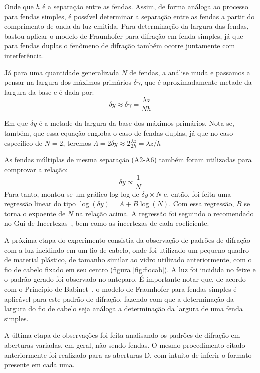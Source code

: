 Onde que $h$ é a separação entre as fendas. Assim, de forma análoga ao processo para fendas simples, é possível determinar a separação entre as fendas a partir do comprimento de onda da luz emitida. Para determinação da largura das fendas, bastou aplicar o modelo de Fraunhofer para difração em fenda simples, já que para fendas duplas o fenômeno de difração também ocorre juntamente com interferência.

Já para uma quantidade generalizada $N$ de fendas, a análise muda e passamos a pensar na largura dos máximos primários $\delta\gamma$, que é aproximadamente metade da largura da base e é dada por:
\begin{equation}
    \delta y \approx \delta\gamma = \frac{\lambda z}{N h} \label{eq:mult}
\end{equation}

Em que $\delta y$ é a metade da largura da base dos máximos primários. Nota-se, também, que essa equação engloba o caso de fendas duplas, já que no caso específico de $N = 2$, teremos $\Lambda = 2 \delta y \approx 2 \frac{\lambda z}{2 h} = \lambda z / h$

As fendas múltiplas de mesma separação (A2-A6) também foram utilizadas para comprovar a relação: $$\delta y \propto \frac{1}{N} \label{rel:dyn}$$ Para tanto, montou-se um gráfico log-log de $\delta y \times N$ e, então, foi feita uma regressão linear do tipo $\log(\delta y) = A + B \log(N)$. Com essa regressão, $B$ se torna o expoente de $N$ na relação acima. A regressão foi seguindo o recomendado no Gui de Incertezas~\cite{ref:gum}, bem como as incertezas de cada coeficiente.

A próxima etapa do experimento consistia da observação de padrões de difração com a luz incidindo em um fio de cabelo, onde foi utilizado um pequeno quadro de material plástico, de tamanho similar ao vidro utilizado anteriormente, com o fio de cabelo fixado em seu centro (figura \ref{fig:fiocab}). A luz foi incidida no feixe e o padrão gerado foi observado no anteparo. É importante notar que, de acordo com o Princípio de Babinet~\cite{ref:wolf}, o modelo de Fraunhofer para fendas simples é aplicável para este padrão de difração, fazendo com que a determinação da largura do fio de cabelo seja análoga a determinação da largura de uma fenda simples.



A última etapa de observações foi feita analisando os padrões de difração em aberturas variadas, em geral, não sendo fendas. O mesmo procedimento citado anteriormente foi realizado para as aberturas D, com intuito de inferir o formato presente em cada uma.

